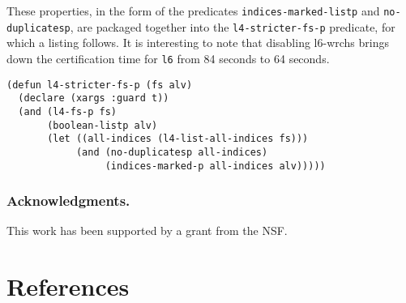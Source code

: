 \documentclass[runningheads,a4paper]{llncs}
\begin{document}
These properties, in the form of the predicates
\texttt{indices-marked-listp} and \texttt{no-duplicatesp}, are
packaged together into the \texttt{l4-stricter-fs-p} predicate, for
which a listing follows.%
It is interesting to note that disabling l6-wrchs brings down the
certification time for \texttt{l6} from 84 seconds to 64 seconds.

\medskip

\noindent
\begin{verbatim}
(defun l4-stricter-fs-p (fs alv)
  (declare (xargs :guard t))
  (and (l4-fs-p fs)
       (boolean-listp alv)
       (let ((all-indices (l4-list-all-indices fs)))
            (and (no-duplicatesp all-indices)
                 (indices-marked-p all-indices alv)))))
\end{verbatim}

\subsubsection*{Acknowledgments.} This work has been supported by a
grant from the NSF.

\section{References}\label{references}



\end{document}
